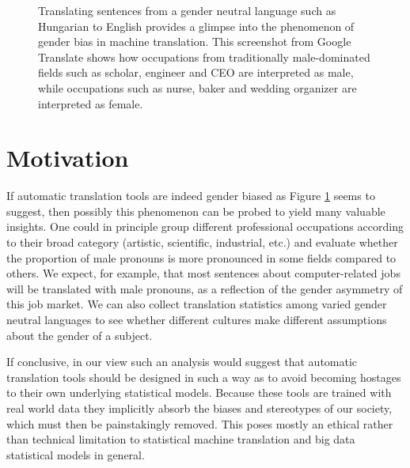 \documentclass[jair,twoside,11pt,theapa]{article}
\begin{document}
\begin{figure}[h]
  \centering
  \label{fig:screenshot-gtranslate-hungarian}
  \caption{Translating sentences from a gender neutral language such as Hungarian to English provides a glimpse into the phenomenon of gender bias in machine translation. This screenshot from Google Translate shows how occupations from traditionally male-dominated fields such as scholar, engineer and CEO are interpreted as male, while occupations such as nurse, baker and wedding organizer are interpreted as female.}
\end{figure}

\section{Motivation}

If automatic translation tools are indeed gender biased as Figure \ref{fig:screenshot-gtranslate-hungarian} seems to suggest, then possibly this phenomenon can be probed to yield many valuable insights. One could in principle group different professional occupations according to their broad category (artistic, scientific, industrial, etc.) and evaluate whether the proportion of male pronouns is more pronounced in some fields compared to others. We expect, for example, that most sentences about computer-related jobs will be translated with male pronouns, as a reflection of the gender asymmetry of this job market. We can also collect translation statistics among varied gender neutral languages to see whether different cultures make different assumptions about the gender of a subject.

If conclusive, in our view such an analysis would suggest that automatic translation tools should be designed in such a way as to avoid becoming hostages to their own underlying statistical models. Because these tools are trained with real world data they implicitly absorb the biases and stereotypes of our society, which must then be painstakingly removed. This poses 
mostly an ethical rather than technical limitation to statistical machine translation and big data statistical models in general.
\end{document}
